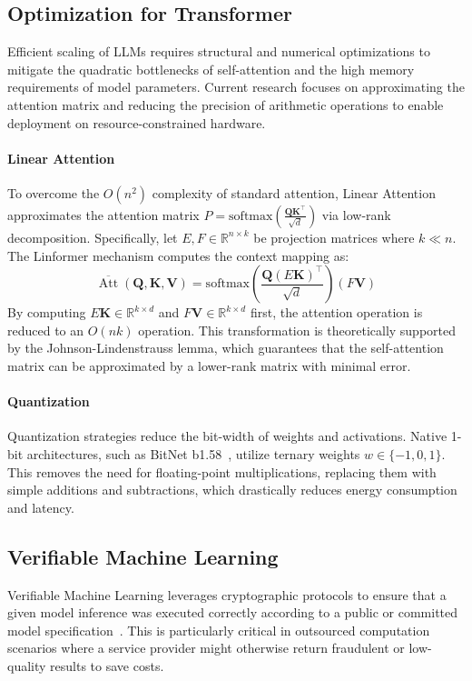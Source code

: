 \documentclass{article}
\newcommand{\RR}{\mathbb{R}}          %
\newcommand{\bQ}{\mathbf{Q}}
\newcommand{\bK}{\mathbf{K}}
\newcommand{\bV}{\mathbf{V}}
\newcommand{\softmax}{\mathrm{softmax}}
\DeclareMathOperator{\Att}{Att}
\begin{document}
\subsection{Optimization for Transformer}
Efficient scaling of LLMs requires structural and numerical optimizations to mitigate the quadratic bottlenecks of self-attention and the high memory requirements of model parameters. Current research focuses on approximating the attention matrix and reducing the precision of arithmetic operations to enable deployment on resource-constrained hardware.

\paragraph{Linear Attention}
To overcome the $O(n^2)$ complexity of standard attention, Linear Attention approximates the attention matrix $P = \softmax(\frac{\bQ\bK^\top}{\sqrt{d}})$ via low-rank decomposition. Specifically, let $E, F \in \RR^{n \times k}$ be projection matrices where $k \ll n$. The Linformer mechanism computes the context mapping as:
\begin{equation}
    \overline{\Att}(\bQ, \bK, \bV) = \softmax\!\left(\frac{\bQ(E\bK)^\top}{\sqrt{d}}\right)(F\bV)
\end{equation}
By computing $E\bK \in \RR^{k \times d}$ and $F\bV \in \RR^{k \times d}$ first, the attention operation is reduced to an $O(nk)$ operation. This transformation is theoretically supported by the Johnson-Lindenstrauss lemma, which guarantees that the self-attention matrix can be approximated by a lower-rank matrix with minimal error.


\paragraph{Quantization}
Quantization strategies reduce the bit-width of weights and activations. Native 1-bit architectures, such as BitNet b1.58~\cite{ma2025bitnet}, utilize ternary weights $w \in \{-1, 0, 1\}$. This removes the need for floating-point multiplications, replacing them with simple additions and subtractions, which drastically reduces energy consumption and latency.

\subsection{Verifiable Machine Learning}
Verifiable Machine Learning leverages cryptographic protocols to ensure that a given model inference was executed correctly according to a public or committed model specification~\cite{sun2024zkllm}. This is particularly critical in outsourced computation scenarios where a service provider might otherwise return fraudulent or low-quality results to save costs.
\end{document}
